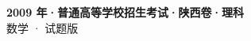 \documentclass[zihao=-4, a4paper]{ctexart}
\begin{document}
\begin{center}
  {\Large\bfseries 2009 年·普通高等学校招生考试·陕西卷·理科}\\[4pt]
  {\large 数学 · 试题版}
\end{center}
\medskip
{}

\end{document}
